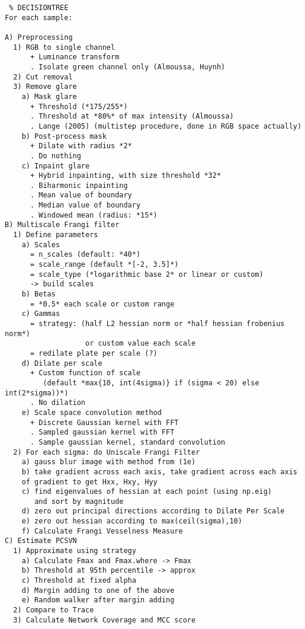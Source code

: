     \begin{spacing}{1}
    \begin{small}
    \begin{verbatim} % DECISIONTREE
For each sample:

A) Preprocessing
  1) RGB to single channel
      + Luminance transform
      . Isolate green channel only (Almoussa, Huynh)
  2) Cut removal
  3) Remove glare 
    a) Mask glare
      + Threshold (*175/255*)
      . Threshold at *80%* of max intensity (Almoussa)
      . Lange (2005) (multistep procedure, done in RGB space actually)
    b) Post-process mask
      + Dilate with radius *2*
      . Do nothing
    c) Inpaint glare
      + Hybrid inpainting, with size threshold *32*
      . Biharmonic inpainting
      . Mean value of boundary 
      . Median value of boundary 
      . Windowed mean (radius: *15*)
B) Multiscale Frangi filter
  1) Define parameters
    a) Scales
      = n_scales (default: *40*)
      = scale_range (default *[-2, 3.5]*)
      = scale_type (*logarithmic base 2* or linear or custom)
      -> build scales
    b) Betas
      = *0.5* each scale or custom range
    c) Gammas
      = strategy: (half L2 hessian norm or *half hessian frobenius norm*)
                   or custom value each scale
      = redilate plate per scale (?)
    d) Dilate per scale 
      + Custom function of scale
         (default *max{10, int(4sigma)} if (sigma < 20) else int(2*sigma))*)
      . No dilation
    e) Scale space convolution method
      + Discrete Gaussian kernel with FFT
      . Sampled gaussian kernel with FFT
      . Sample gaussian kernel, standard convolution
  2) For each sigma: do Uniscale Frangi Filter
    a) gauss blur image with method from (1e)
    b) take gradient across each axis, take gradient across each axis
    of gradient to get Hxx, Hxy, Hyy
    c) find eigenvalues of hessian at each point (using np.eig)
       and sort by magnitude 
    d) zero out principal directions according to Dilate Per Scale
    e) zero out hessian according to max(ceil(sigma),10)
    f) Calculate Frangi Vesselness Measure
C) Estimate PCSVN
  1) Approximate using strategy
    a) Calculate Fmax and Fmax.where -> Fmax
    b) Threshold at 95th percentile -> approx
    c) Threshold at fixed alpha
    d) Margin adding to one of the above
    e) Random walker after margin adding
  2) Compare to Trace
  3) Calculate Network Coverage and MCC score
\end{verbatim}
    \end{small}
\end{spacing}

